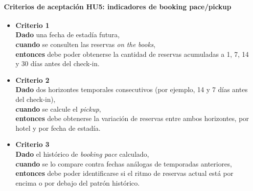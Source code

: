 \documentclass[
11pt, %
]{charter}
\begin{document}
\paragraph{Criterios de aceptación HU5: indicadores de booking pace/pickup}
\begin{itemize}
  \item \textbf{Criterio 1} \\
  \textbf{Dado} una fecha de estadía futura, \\
  \textbf{cuando} se consulten las reservas \textit{on the books}, \\
  \textbf{entonces} debe poder obtenerse la cantidad de reservas acumuladas a 1, 7, 14 y 30 días antes del check-in.

  \item \textbf{Criterio 2} \\
  \textbf{Dado} dos horizontes temporales consecutivos (por ejemplo, 14 y 7 días antes del check-in), \\
  \textbf{cuando} se calcule el \textit{pickup}, \\
  \textbf{entonces} debe obtenerse la variación de reservas entre ambos horizontes, por hotel y por fecha de estadía.

  \item \textbf{Criterio 3} \\
  \textbf{Dado} el histórico de \textit{booking pace} calculado, \\
  \textbf{cuando} se lo compare contra fechas análogas de temporadas anteriores, \\
  \textbf{entonces} debe poder identificarse si el ritmo de reservas actual está por encima o por debajo del patrón histórico.
\end{itemize}

\vspace{1em}
\end{document}
